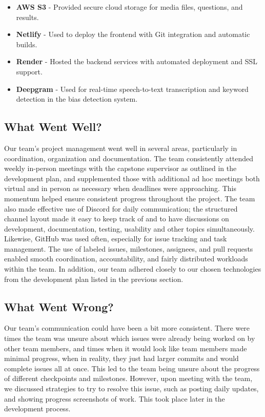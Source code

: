 \documentclass{article}
\begin{document}
\begin{itemize}
    \item \textbf{AWS S3} - Provided secure cloud storage for media files, questions, and results.
    
    \item \textbf{Netlify} - Used to deploy the frontend with Git integration and automatic builds.
    
    \item \textbf{Render} - Hosted the backend services with automated deployment and SSL support.
    
    \item \textbf{Deepgram} - Used for real-time speech-to-text transcription and keyword detection in the 
    bias detection system.
\end{itemize}

\subsection{What Went Well?}

Our team's project management went well in several areas, particularly in coordination, organization and documentation. The team consistently attended weekly in-person meetings 
with the capstone supervisor as outlined in the development plan, and supplemented those with additional ad hoc meetings both virtual and in person as necessary when deadlines were 
approaching. This momentum helped ensure consistent progress throughout the project. The team also made effective use of Discord for daily communication; the structured channel layout 
made it easy to keep track of and to have discussions on development, documentation, testing, usability and other topics simultaneously. Likewise, GitHub was used often, especially 
for issue tracking and task management. The use of labeled issues, milestones, assignees, and pull requests enabled smooth coordination, accountability, and fairly distributed workloads 
within the team. In addition, our team adhered closely to our chosen technologies from the development plan listed in the previous section.

\subsection{What Went Wrong?}

\hspace{2em}Our team's communication could have been a bit more consistent. There were times the team was unsure about which issues were already being worked on by other team members,
and times when it would look like team members made minimal progress, when in reality, they just had larger commits and would complete issues all at once. This led to
the team being unsure about the progress of different checkpoints and milestones. However, upon meeting with the team, we discussed strategies to try to resolve this issue, such
as posting daily updates, and showing progress screenshots of work. This took place later in the development process.\\
\end{document}
